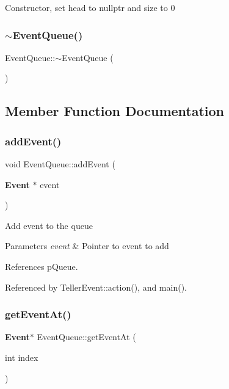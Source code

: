 Constructor, set head to nullptr and size to 0 \mbox{\label{classEventQueue_ac57db8e2366f2c6c594e6afc975e3b59}} 
\subsubsection{$\sim$\+Event\+Queue()}
{\footnotesize\ttfamily Event\+Queue\+::$\sim$\+Event\+Queue (\begin{DoxyParamCaption}{ }\end{DoxyParamCaption})\hspace{0.3cm}{\ttfamily [virtual]}}



\subsection{Member Function Documentation}
\mbox{\label{classEventQueue_a55e0d159086c702174a66e18dea05b78}} 
\subsubsection{add\+Event()}
{\footnotesize\ttfamily void Event\+Queue\+::add\+Event (\begin{DoxyParamCaption}\item[{\textbf{ Event} $\ast$}]{event }\end{DoxyParamCaption})}

Add event to the queue 
\begin{DoxyParams}{Parameters}
{\em event} & Pointer to event to add \\
\hline
\end{DoxyParams}


References p\+Queue.



Referenced by Teller\+Event\+::action(), and main().

\mbox{\label{classEventQueue_ab825fbc68ac03236a8c88c024ee6f81d}} 
\subsubsection{get\+Event\+At()}
{\footnotesize\ttfamily \textbf{ Event}$\ast$ Event\+Queue\+::get\+Event\+At (\begin{DoxyParamCaption}\item[{int}]{index }\end{DoxyParamCaption})}

